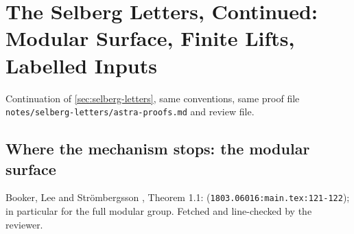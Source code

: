 
\section{The Selberg Letters, Continued: Modular Surface, Finite Lifts, Labelled Inputs}
\label{sec:selberg-letters-finite}

Continuation of \cref{sec:selberg-letters}, same conventions, same proof file
\texttt{notes/selberg-letters/astra-proofs.md} and review file.

\subsection{Where the mechanism stops: the modular surface}

\begin{citedfact}
\label{cit:bls-selberg-level-one}
Booker, Lee and Str\"ombergsson \cite{booker2018twist}, Theorem 1.1:
\texttt{}
(\texttt{1803.06016:main.tex:121-122}); in particular for the full modular group. Fetched and
line-checked by the reviewer.
\end{citedfact}

